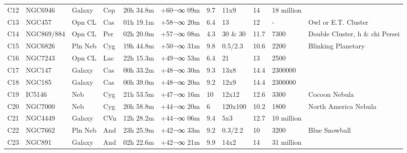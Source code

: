 \documentclass[10pt,twoside,a4paper,english]{report}
\begin{document}
\begin{longtable}{@{}lllllllllll@{}}
C12        & NGC6946     & Galaxy     & Cep       & 20h 34.8m & +60¬∞ 09m  & 9.7       & 11x9                 & 14       & 18 million          &                                 \\ 
C13        & NGC457      & Opn CL     & Cas       & 01h 19.1m & +58¬∞ 20m  & 6.4       & 13                   & 12       & -                   & Owl or E.T. Cluster             \\ 
C14        & NGC869/884  & Opn CL     & Per       & 02h 20.0m & +57¬∞ 08m  & 4.3       & 30 \& 30             & 11.7     & 7300                & Double Cluster, h \& chi Persei \\ 
C15        & NGC6826     & Pln Neb    & Cyg       & 19h 44.8m & +50¬∞ 31m  & 9.8       & 0.5/2.3              & 10.6     & 2200                & Blinking Planetary              \\ 
C16        & NGC7243     & Opn CL     & Lac       & 22h 15.3m & +49¬∞ 53m  & 6.4       & 21                   & 13       & 2500                &                                 \\ 
C17        & NGC147      & Galaxy     & Cas       & 00h 33.2m & +48¬∞ 30m  & 9.3       & 13x8                 & 14.4     & 2300000             &                                 \\ 
C18        & NGC185      & Galaxy     & Cas       & 00h 39.0m & +48¬∞ 20m  & 9.2       & 12x9                 & 14.4     & 2300000             &                                 \\ 
C19        & IC5146      & Neb        & Cyg       & 21h 53.5m & +47¬∞ 16m  & 10        & 12x12                & 12.6     & 3300                & Cocoon Nebula                   \\ 
C20        & NGC7000     & Neb        & Cyg       & 20h 58.8m & +44¬∞ 20m  & 6         & 120x100              & 10.2     & 1800                & North America Nebula            \\ 
C21        & NGC4449     & Galaxy     & CVn       & 12h 28.2m & +44¬∞ 06m  & 9.4       & 5x3                  & 12.7     & 10 million          &                                 \\ 
C22        & NGC7662     & Pln Neb    & And       & 23h 25.9m & +42¬∞ 33m  & 9.2       & 0.3/2.2              & 10       & 3200                & Blue Snowball                   \\ 
C23        & NGC891      & Galaxy     & And       & 02h 22.6m & +42¬∞ 21m  & 9.9       & 14x2                 & 14       & 31 million          &                                 \\ 

\end{longtable}
\end{document}
